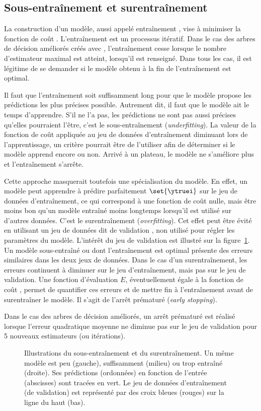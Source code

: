 \subsection{Sous-entraînement et surentraînement}
La construction d'un modèle, aussi appelé \og entraînement \fg,
vise à minimiser la fonction de coût \Loss.
L'entraînement est un processus itératif.
Dans le cas des arbres de décision améliorés créés avec \XGBOOST,
l'entraînement cesse lorsque le nombre d'estimateur maximal est atteint, lorsqu'il est renseigné.
Dans tous les cas, il est légitime de se demander si le modèle obtenu à la fin de l'entraînement est optimal.
\par
Il faut que l'entraînement soit suffisamment long pour que le modèle propose les prédictions les plus précises possible.
Autrement dit, il faut que le modèle ait le temps d'apprendre.
S'il ne l'a pas, les prédictions ne sont pas aussi précises qu'elles pourraient l'être, c'est le sous-entraînement (\emph{underfitting}).
La valeur de la fonction de coût appliquée au jeu de données d'entraînement diminuant lors de l'apprentissage,
un critère pourrait être de l'utiliser afin de déterminer si le modèle apprend encore ou non.
Arrivé à un plateau, le modèle ne s'améliore plus et l'entraînement s'arrête.
\par
Cette approche masquerait toutefois une spécialisation du modèle.
En effet, un modèle peut apprendre à prédire parfaitement $\set{\ytruei}$ sur le jeu de données d'entraînement,
ce qui correspond à une fonction de coût nulle,
mais être moins bon qu'un modèle entraîné moins longtemps lorsqu'il est utilisé sur d'autres données.
C'est le surentraînement (\emph{overfitting}).
Cet effet peut être évité en utilisant un jeu de données dit de \og validation \fg,
non utilisé pour régler les paramètres du modèle.
L'intérêt du jeu de validation est illustré sur la figure~\ref{fig-underfitting_and_overfitting}.
Un modèle sous-entraîné ou dont l'entraînement est optimal présente des erreurs similaires dans les deux jeux de données.
Dans le cas d'un surentraînement, les erreurs continuent à diminuer sur le jeu d'entraînement, mais pas sur le jeu de validation.
Une fonction d'évaluation $E$, éventuellement égale à la fonction de coût \Loss, permet de quantifier ces erreurs et de mettre fin à l'entraînement avant de surentraîner le modèle.
Il s'agit de l'arrêt prématuré (\emph{early stopping}).
\par
Dans le cas des arbres de décision améliorés, un arrêt prématuré est réalisé lorsque l'erreur quadratique moyenne ne diminue pas sur le jeu de validation pour 5 nouveaux estimateurs (ou itérations).
\begin{figure}[h]
\centering

\caption[Illustrations du sous-entraînement et du surentraînement.]{Illustrations du sous-entraînement et du surentraînement.
Un même modèle est peu (gauche), suffisamment (milieu) ou trop entraîné (droite). Ses prédictions (ordonnées) en fonction de l'entrée (abscisses) sont tracées en vert.
Le jeu de données d'entraînement (de validation) est représenté par des croix bleues (rouges) sur la ligne du haut (bas).}
\label{fig-underfitting_and_overfitting}
\end{figure}